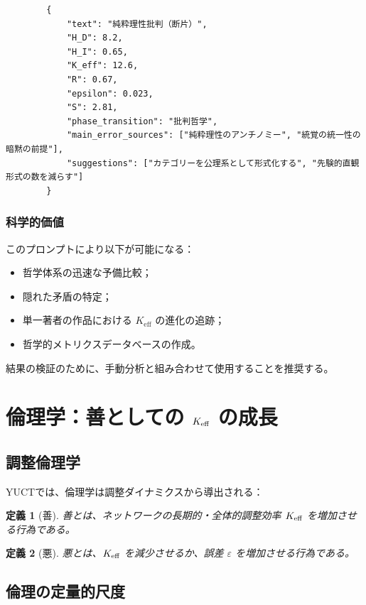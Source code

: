 \documentclass[11pt,a4paper]{article}
\newtheorem{definition}{定義}[section]
\newcommand{\eps}{\varepsilon}
\begin{document}
	\begin{verbatim}
		{
			"text": "純粋理性批判（断片）",
			"H_D": 8.2,
			"H_I": 0.65,
			"K_eff": 12.6,
			"R": 0.67,
			"epsilon": 0.023,
			"S": 2.81,
			"phase_transition": "批判哲学",
			"main_error_sources": ["純粋理性のアンチノミー", "統覚の統一性の暗黙の前提"],
			"suggestions": ["カテゴリーを公理系として形式化する", "先験的直観形式の数を減らす"]
		}
	\end{verbatim}
	
	\subsubsection{科学的価値}
	
	このプロンプトにより以下が可能になる：
	\begin{itemize}
		\item 哲学体系の迅速な予備比較；
		\item 隠れた矛盾の特定；
		\item 単一著者の作品における \(K_{\mathrm{eff}}\) の進化の追跡；
		\item 哲学的メトリクスデータベースの作成。
	\end{itemize}
	
	結果の検証のために、手動分析と組み合わせて使用することを推奨する。
	
	\section{倫理学：善としての \texorpdfstring{\(\Keff\)}{K\_eff} の成長}
	
	\subsection{調整倫理学}
	
	YUCTでは、倫理学は調整ダイナミクスから導出される：
	
	\begin{definition}[善]
		善とは、ネットワークの長期的・全体的調整効率 \(\Keff\) を増加させる行為である。
	\end{definition}
	
	\begin{definition}[悪]
		悪とは、\(\Keff\) を減少させるか、誤差 \(\eps\) を増加させる行為である。
	\end{definition}
	
	\subsection{倫理の定量的尺度}
	
\end{document}
